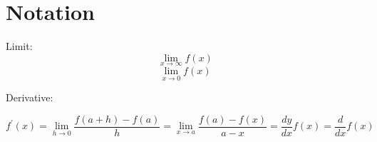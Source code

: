 \section{Notation}
\noindent

Limit:
$$\lim_{x \to \infty} f(x)$$
$$\lim_{x \to 0} f(x)$$

Derivative:

$$
f^\prime(x) =
\lim_{h \to 0} \frac{f(a + h) - f(a)}{h} =
\lim_{x \to a} \frac{f(a) - f(x)}{a - x} =
\frac{dy}{dx}f(x) =
\frac{d}{dx}f(x)
$$
